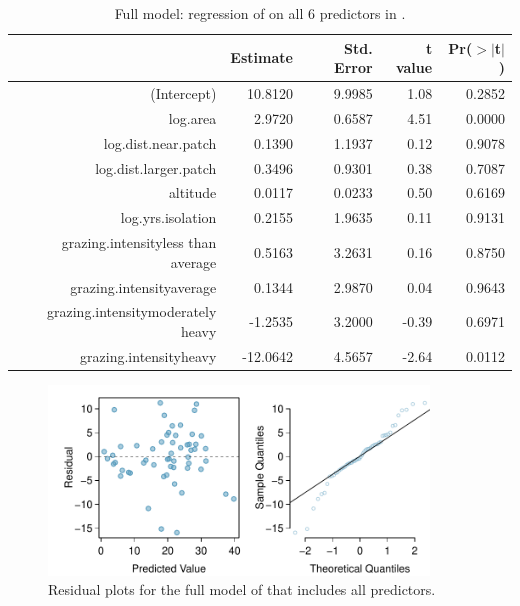 \begin{table}[ht]
\centering
\begin{tabular}{rrrrr}
  \hline
 & Estimate & Std. Error & t value & Pr($>$$|$t$|$) \\ 
  \hline
(Intercept) & 10.8120 & 9.9985 & 1.08 & 0.2852 \\ 
  log.area & 2.9720 & 0.6587 & 4.51 & 0.0000 \\ 
  log.dist.near.patch & 0.1390 & 1.1937 & 0.12 & 0.9078 \\ 
  log.dist.larger.patch & 0.3496 & 0.9301 & 0.38 & 0.7087 \\ 
  altitude & 0.0117 & 0.0233 & 0.50 & 0.6169 \\ 
  log.yrs.isolation & 0.2155 & 1.9635 & 0.11 & 0.9131 \\ 
  grazing.intensityless than average & 0.5163 & 3.2631 & 0.16 & 0.8750 \\ 
  grazing.intensityaverage & 0.1344 & 2.9870 & 0.04 & 0.9643 \\ 
  grazing.intensitymoderately heavy & -1.2535 & 3.2000 & -0.39 & 0.6971 \\ 
  grazing.intensityheavy & -12.0642 & 4.5657 & -2.64 & 0.0112 \\ 
   \hline
\end{tabular}

\caption{Full model: regression of  on all 6 predictors in .}
\label{forestbirdsFullModel}
\end{table}

\begin{figure}[h!]
 	\centering
 	\includegraphics[width=0.9\textwidth]
{ch_multiple_linear_regression_oi_biostat/figures/forestbirdsAbunFullModelResidNormPlots/forestbirdsAbunFullModelResidNormPlots.pdf}
     \caption{Residual plots for the full model of  that includes all predictors.}
    	\label{forestbirdsAbunFullModelResidNormPlots}
 \end{figure}

